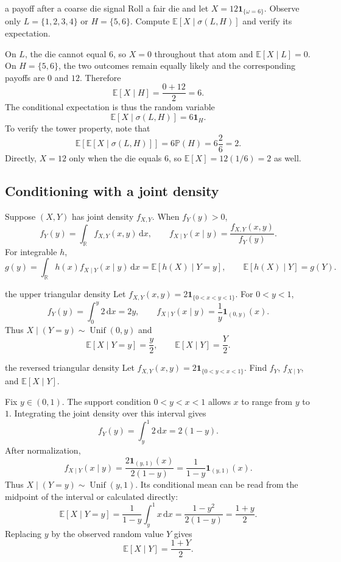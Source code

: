 \documentclass[10pt]{article}
\newcommand{\E}{\mathbb E}
\newcommand{\Pbb}{\mathbb P}
\newcommand{\R}{\mathbb R}
\newcommand{\1}{\mathbf 1}
\newcommand{\dd}{\,\mathrm d}
\theoremstyle{definition}
\begin{document}
\begin{studentexercise}{a payoff after a coarse die signal}
Roll a fair die and let $X=12\1_{\{\omega=6\}}$. Observe only
$L=\{1,2,3,4\}$ or $H=\{5,6\}$. Compute
$\E[X\mid\sigma(L,H)]$ and verify its expectation.
\end{studentexercise}
\begin{shortsolution}
On $L$, the die cannot equal $6$, so $X=0$ throughout that atom and
$\E[X\mid L]=0$. On $H=\{5,6\}$, the two outcomes remain equally likely and
the corresponding payoffs are $0$ and $12$. Therefore
\[
\E[X\mid H]=\frac{0+12}{2}=6.
\]
The conditional expectation is thus the random variable
\[
\E[X\mid\sigma(L,H)]=6\1_H.
\]
To verify the tower property, note that
\[
\E\!\left[\E[X\mid\sigma(L,H)]\right]
=6\Pbb(H)=6\frac26=2.
\]
Directly, $X=12$ only when the die equals $6$, so
$\E[X]=12(1/6)=2$ as well.
\end{shortsolution}

\subsection{Conditioning with a joint density}

Suppose $(X,Y)$ has joint density $f_{X,Y}$. When $f_Y(y)>0$,
\[
f_Y(y)=\int_{\R}f_{X,Y}(x,y)\dd x,
\qquad
f_{X\mid Y}(x\mid y)=\frac{f_{X,Y}(x,y)}{f_Y(y)}.
\]
For integrable $h$,
\[
g(y)=\int_{\R}h(x)f_{X\mid Y}(x\mid y)\dd x
=\E[h(X)\mid Y=y],
\qquad
\E[h(X)\mid Y]=g(Y).
\]

\begin{boardexample}{the upper triangular density}
Let $f_{X,Y}(x,y)=2\1_{\{0<x<y<1\}}$. For $0<y<1$,
\[
f_Y(y)=\int_0^y2\dd x=2y,
\qquad
f_{X\mid Y}(x\mid y)=\frac1y\1_{(0,y)}(x).
\]
Thus $X\mid(Y=y)\sim\operatorname{Unif}(0,y)$ and
\[
\E[X\mid Y=y]=\frac y2,
\qquad
\E[X\mid Y]=\frac Y2.
\]
\end{boardexample}

\begin{studentexercise}{the reversed triangular density}
Let $f_{X,Y}(x,y)=2\1_{\{0<y<x<1\}}$. Find $f_Y$, $f_{X\mid Y}$, and
$\E[X\mid Y]$.
\end{studentexercise}
\begin{shortsolution}
Fix $y\in(0,1)$. The support condition $0<y<x<1$ allows $x$ to range from
$y$ to $1$. Integrating the joint density over this interval gives
\[
f_Y(y)=\int_y^1 2\dd x=2(1-y).
\]
After normalization,
\[
f_{X\mid Y}(x\mid y)
=\frac{2\1_{(y,1)}(x)}{2(1-y)}
=\frac1{1-y}\1_{(y,1)}(x).
\]
Thus $X\mid(Y=y)\sim\operatorname{Unif}(y,1)$. Its conditional mean can be
read from the midpoint of the interval or calculated directly:
\[
\E[X\mid Y=y]
=\frac1{1-y}\int_y^1x\dd x
=\frac{1-y^2}{2(1-y)}
=\frac{1+y}{2}.
\]
Replacing $y$ by the observed random value $Y$ gives
\[
\E[X\mid Y]=\frac{1+Y}{2}.
\]
\end{shortsolution}
\end{document}
